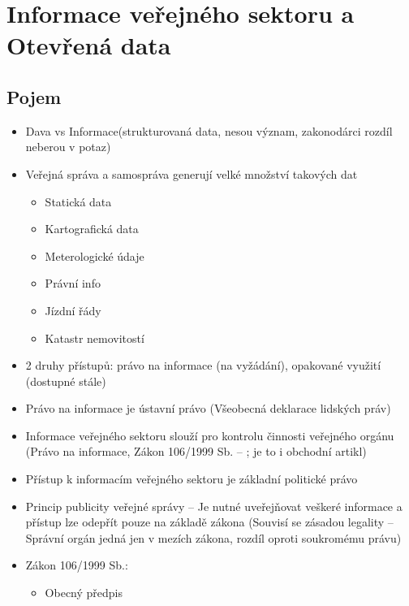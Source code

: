 \section{Informace veřejného sektoru a Otevřená data}

\subsection{Pojem }
\begin{itemize}
      \item Dava vs Informace(strukturovaná data, nesou význam, zakonodárci rozdíl neberou v potaz)
      \item Veřejná správa a samospráva generují velké množství takových dat
            \begin{itemize}
                  \item Statická data
                  \item Kartografická data
                  \item Meterologické údaje
                  \item Právní info
                  \item Jízdní řády
                  \item Katastr nemovitostí
            \end{itemize}
      \item 2 druhy přístupů: právo na informace (na vyžádání), opakované využití (dostupné stále)
      \item Právo na informace je ústavní právo (Všeobecná deklarace lidských práv)
      \item Informace veřejného sektoru slouží pro kontrolu činnosti veřejného orgánu (Právo na
            informace, Zákon 106/1999 Sb. – ; je to i obchodní artikl)
      \item Přístup k informacím veřejného sektoru je základní politické právo
      \item Princip publicity veřejné správy – Je nutné uveřejňovat veškeré informace a přístup lze
            odepřít pouze na základě zákona (Souvisí se zásadou legality – Správní orgán jedná jen
            v mezích zákona, rozdíl oproti soukromému právu)
      \item Zákon 106/1999 Sb.:
            \begin{itemize}
                  \item Obecný předpis
                        \begin{itemize}

\end{itemize}
\end{itemize}
\end{itemize}
